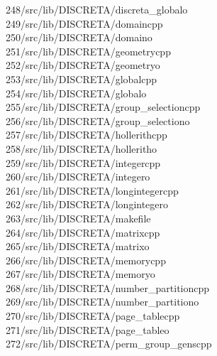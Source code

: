 \begin{tabbing}
248\>/src/lib/DISCRETA/discreta\_globalo\\[0pt]
249\>/src/lib/DISCRETA/domaincpp\\[0pt]
250\>/src/lib/DISCRETA/domaino\\[0pt]
251\>/src/lib/DISCRETA/geometrycpp\\[0pt]
252\>/src/lib/DISCRETA/geometryo\\[0pt]
253\>/src/lib/DISCRETA/globalcpp\\[0pt]
254\>/src/lib/DISCRETA/globalo\\[0pt]
255\>/src/lib/DISCRETA/group\_selectioncpp\\[0pt]
256\>/src/lib/DISCRETA/group\_selectiono\\[0pt]
257\>/src/lib/DISCRETA/hollerithcpp\\[0pt]
258\>/src/lib/DISCRETA/holleritho\\[0pt]
259\>/src/lib/DISCRETA/integercpp\\[0pt]
260\>/src/lib/DISCRETA/integero\\[0pt]
261\>/src/lib/DISCRETA/longintegercpp\\[0pt]
262\>/src/lib/DISCRETA/longintegero\\[0pt]
263\>/src/lib/DISCRETA/makefile\\[0pt]
264\>/src/lib/DISCRETA/matrixcpp\\[0pt]
265\>/src/lib/DISCRETA/matrixo\\[0pt]
266\>/src/lib/DISCRETA/memorycpp\\[0pt]
267\>/src/lib/DISCRETA/memoryo\\[0pt]
268\>/src/lib/DISCRETA/number\_partitioncpp\\[0pt]
269\>/src/lib/DISCRETA/number\_partitiono\\[0pt]
270\>/src/lib/DISCRETA/page\_tablecpp\\[0pt]
271\>/src/lib/DISCRETA/page\_tableo\\[0pt]
272\>/src/lib/DISCRETA/perm\_group\_genscpp\\[0pt]

\end{tabbing}

